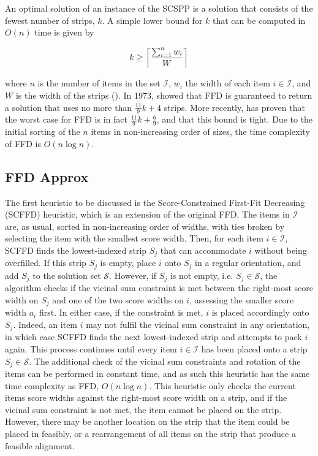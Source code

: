 \documentclass[oribibl]{llncs}
\begin{document}
An optimal solution of an instance of the SCSPP is a solution that consists of the fewest number of strips, $k$. A simple lower bound for $k$ that can be computed in $O(n)$ time is given by

\begin{equation}
	\label{eqn:lowerbound}
	k \geq \ceil*{\frac{\sum_{i=1}^{n}w_i}{W}}
\end{equation}

where $n$ is the number of items in the set $\mathcal{I}$, $w_i$ the width of each item $i \in \mathcal{I}$, and $W$ is the width of the strips (\citealp{martello1990b}). In 1973, \citeauthor{johnson1973} showed that FFD is guaranteed to return a solution that uses no more than $\frac{11}{9}k + 4$ strips. More recently, \cite{dosa2007} has proven that the worst case for FFD is in fact $\frac{11}{9}k + \frac{6}{9}$, and that this bound is tight. Due to the initial sorting of the $n$ items in non-increasing order of sizes, the time complexity of FFD is $O(n\log n)$.


\subsection{FFD Approx}
\label{sec:ffdapprox}
The first heuristic to be discussed is the Score-Constrained First-Fit Decreasing (SCFFD) heuristic, which is an extension of the original FFD. The items in $\mathcal{I}$ are, as usual, sorted in non-increasing order of widths, with ties broken by selecting the item with the smallest score width. Then, for each item $i \in \mathcal{I}$, SCFFD finds the lowest-indexed strip $S_j$ that can accommodate $i$ without being overfilled. If this strip $S_j$ is empty, place $i$ onto $S_j$ in a regular orientation, and add $S_j$ to the solution set $\mathcal{S}$. However, if $S_j$ is not empty, i.e. $S_j \in \mathcal{S}$, the algorithm checks if the vicinal sum constraint is met between the right-most score width on $S_j$ and one of the two score widths on $i$, assessing the smaller score width $a_i$ first. In either case, if the constraint is met, $i$ is placed accordingly onto $S_j$. Indeed, an item $i$ may not fulfil the vicinal sum constraint in any orientation, in which case SCFFD finds the next lowest-indexed strip and attempts to pack $i$ again. This process continues until every item $i \in \mathcal{I}$ has been placed onto a strip $S_j \in \mathcal{S}$. The additional check of the vicinal sum constraints and rotation of the items can be performed in constant time, and as such this heuristic has the same time complexity as FFD, $O(n \log n)$. This heuristic only checks the current items score widths against the right-most score width on a strip, and if the vicinal sum constraint is not met, the item cannot be placed on the strip. However, there may be another location on the strip that the item could be placed in feasibly, or a rearrangement of all items on the strip that produce a feasible alignment.
\end{document}
